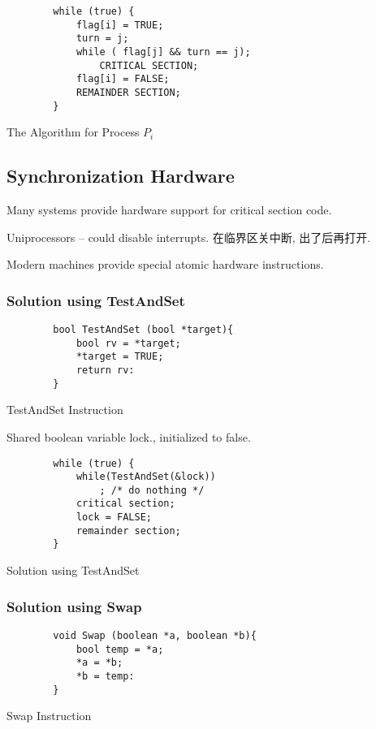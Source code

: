 \begin{code}
    \centering
    \begin{verbatim}
        while (true) {
            flag[i] = TRUE;
            turn = j;
            while ( flag[j] && turn == j);
                CRITICAL SECTION;
            flag[i] = FALSE;
            REMAINDER SECTION;
        }
    \end{verbatim}
    \caption{The Algorithm for Process $P_i$}
\end{code}

\subsection{Synchronization Hardware}
Many systems provide hardware support for critical section code.

Uniprocessors -- could disable interrupts. 在临界区关中断, 出了后再打开.

Modern machines provide special atomic hardware instructions. 

\subsubsection{Solution using TestAndSet}
\begin{code}
    \begin{verbatim}
        bool TestAndSet (bool *target){
            bool rv = *target;
            *target = TRUE;
            return rv:
        }
    \end{verbatim}
    \caption{TestAndSet Instruction}
\end{code}

Shared boolean variable lock., initialized to false. 
 
\begin{code}
    \begin{verbatim}
        while (true) {
            while(TestAndSet(&lock))
                ; /* do nothing */
            critical section;
            lock = FALSE;
            remainder section;
        }
    \end{verbatim}
    \caption{Solution using TestAndSet}
\end{code}

\subsubsection{Solution using Swap}
\begin{code}
    \begin{verbatim}
        void Swap (boolean *a, boolean *b){
            bool temp = *a;
            *a = *b;
            *b = temp:
        }
    \end{verbatim}
    \caption{Swap Instruction}
\end{code}

